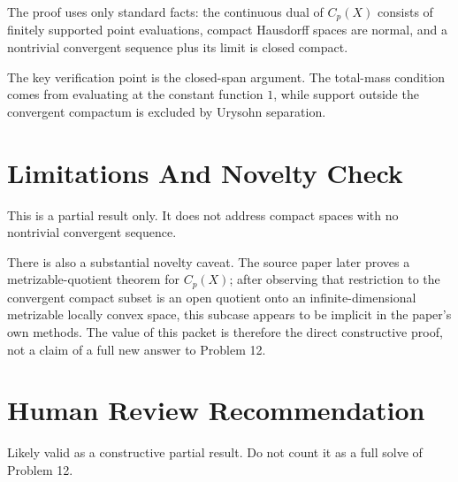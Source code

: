 \documentclass[11pt]{article}
\newcommand{\Cp}{C_p}
\begin{document}
The proof uses only standard facts: the continuous dual of $\Cp(X)$ consists
of finitely supported point evaluations, compact Hausdorff spaces are normal,
and a nontrivial convergent sequence plus its limit is closed compact.

The key verification point is the closed-span argument. The total-mass
condition comes from evaluating at the constant function $1$, while support
outside the convergent compactum is excluded by Urysohn separation.

\section*{Limitations And Novelty Check}

This is a partial result only. It does not address compact spaces with no
nontrivial convergent sequence.

There is also a substantial novelty caveat. The source paper later proves a
metrizable-quotient theorem for $\Cp(X)$; after observing that restriction to
the convergent compact subset is an open quotient onto an infinite-dimensional
metrizable locally convex space, this subcase appears to be implicit in the
paper's own methods. The value of this packet is therefore the direct
constructive proof, not a claim of a full new answer to Problem 12.

\section*{Human Review Recommendation}

Likely valid as a constructive partial result. Do not count it as a full solve
of Problem 12.
\end{document}
